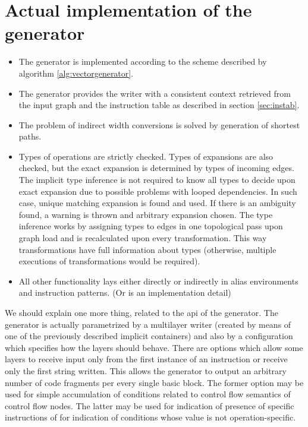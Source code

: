\section{Actual implementation of the generator}

\begin{itemize}
  \item The generator is implemented according to the scheme described by algorithm \ref{alg:vectorgenerator}.  
  \item The generator provides the writer with a consistent context retrieved from the input graph and the instruction table as described in section \ref{sec:instab}. 
  \item The problem of indirect width conversions is solved by generation of shortest paths. 
  \item Types of operations are strictly checked. Types of expansions are also checked, but the exact expansion is determined by types of incoming edges. The implicit type inference is not required to know all types to decide upon exact expansion due to possible problems with looped dependencies. In such case, unique matching expansion is found and used. If there is an ambiguity found, a warning is thrown and arbitrary expansion chosen. The type inference works by assigning types to edges in one topological pass upon graph load and is recalculated upon every transformation. This way transformations have full information about types (otherwise, multiple executions of transformations would be required). 
  \item All other functionality lays either directly or indirectly in alias environments and instruction patterns. (Or is an implementation detail)
\end{itemize}

We should explain one more thing, related to the api of the generator. The generator is actually parametrized by a multilayer writer (created by means of one of the previously described implicit containers) and also by a configuration which specifies how the layers should behave. There are options which allow some layers to receive input only from the first instance of an instruction or receive only the first string written. This allows the generator to output an arbitrary number of code fragments per every single basic block. The former option may be used for simple accumulation of conditions related to control flow semantics of control flow nodes. The latter may be used for indication of presence of specific instructions of for indication of conditions whose value is not operation-specific.




